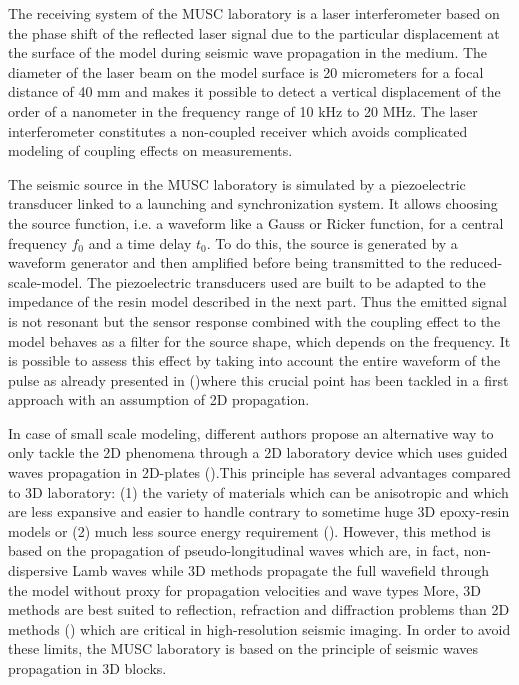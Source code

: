 \documentclass[extra,mreferee]{gji}
\begin{document}
The receiving system of the MUSC laboratory is a laser interferometer based on the phase shift of the reflected laser signal due to the particular displacement at the surface of the model during seismic wave propagation in the medium. The diameter of the laser beam on the model surface is 20 micrometers for a focal distance of 40 mm and makes it possible to detect a vertical displacement of the order of a nanometer in the frequency range of 10 kHz to 20 MHz. The laser interferometer constitutes a non-coupled receiver which avoids complicated modeling of coupling effects on measurements.

The seismic source in the MUSC laboratory is simulated by a piezoelectric transducer linked to a launching and synchronization system. It allows choosing the source function, i.e. a waveform like a Gauss or Ricker function, for a central frequency $f_{0}$ and a time delay $t_{0}$. To do this, the source is generated by a waveform generator and then amplified before being transmitted to the reduced-scale-model. The piezoelectric transducers used are built to be adapted to the impedance of the resin model described in the next part. Thus the emitted signal is not resonant but the sensor response combined with the coupling effect to the model behaves as a filter for the source shape, which depends on the frequency. It is possible to assess this effect by taking into account the entire waveform of the pulse as already presented in (\cite{bretaudeau2011ssm})where this crucial point has been tackled in a first approach with an assumption of 2D propagation.

In case of small scale modeling, different authors propose an alternative way to only tackle the 2D phenomena through a 2D laboratory device which uses guided waves propagation in 2D-plates (\cite{oliver1954two,angona1960two,mo2015development}).This principle has several advantages compared to 3D laboratory: (1) the variety of materials which can be anisotropic and which are less expansive and easier to handle contrary to sometime huge 3D epoxy-resin models or (2) much less source energy requirement (\cite{oliver1954two,mo2015development}). However, this method is based on the propagation of pseudo-longitudinal waves which are, in fact, non-dispersive Lamb waves while 3D methods propagate the full wavefield through the model without proxy for propagation velocities and wave types More, 3D methods are best suited to reflection, refraction and diffraction problems than 2D methods (\cite{angona1960two}) which are critical in high-resolution seismic imaging. In order to avoid these limits, the MUSC laboratory is based on the principle of seismic waves propagation in 3D blocks.
\end{document}

